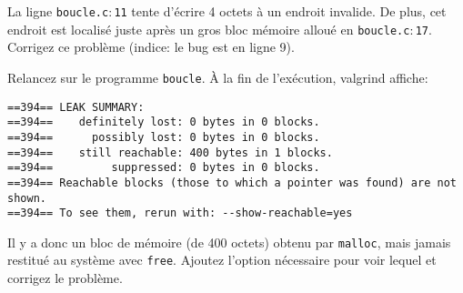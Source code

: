 \documentclass[10pt]{article}\usepackage[nu]{esial}
\begin{document}
\begin{Exercice}
  La ligne \texttt{boucle.c$:$11} tente d'écrire 4 octets à un endroit
  invalide. De plus, cet endroit est localisé juste après un gros bloc mémoire
  alloué en \texttt{boucle.c$:$17}. Corrigez ce problème (indice: le bug est en
  ligne 9).

  \Question Relancez  sur le programme \texttt{boucle}.  À la fin
  de l'exécution, valgrind affiche:
  \begin{Verbatim}
==394== LEAK SUMMARY:
==394==    definitely lost: 0 bytes in 0 blocks.
==394==      possibly lost: 0 bytes in 0 blocks.
==394==    still reachable: 400 bytes in 1 blocks.
==394==         suppressed: 0 bytes in 0 blocks.
==394== Reachable blocks (those to which a pointer was found) are not shown.
==394== To see them, rerun with: --show-reachable=yes    
  \end{Verbatim}
  
  Il y a donc un bloc de mémoire (de 400 octets) obtenu par \texttt{malloc},
  mais jamais restitué au système avec \texttt{free}.  Ajoutez l'option
  nécessaire pour voir lequel et corrigez le problème.
\end{Exercice}
\end{document}
